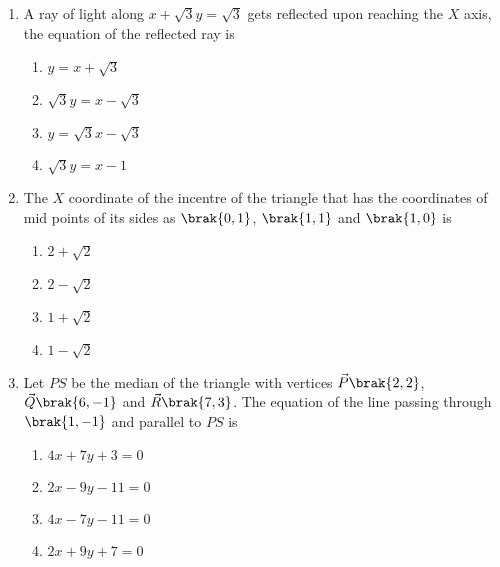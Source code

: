 \begin{enumerate}[label=\thesubsection.\arabic*.,ref=\thesubsection.\theenumi]
\item A ray of light along $x+\sqrt{3}y=\sqrt{3}$ gets reflected upon reaching the $X$ axis, the equation of the reflected ray is \hfill {}
\begin{multicols}{2}
\begin{enumerate}
\item $y=x+\sqrt{3}$
\item $\sqrt{3}y=x-\sqrt{3}$
\item $y=\sqrt{3}x-\sqrt{3}$
\item $\sqrt{3}y=x-1$
\end{enumerate}
\end{multicols}
%
\item The $X$ coordinate of the incentre of the triangle that has the coordinates of mid points of its sides as $\brak{0, 1}$, $\brak{1, 1}$ and $\brak{1, 0}$ is
\hfill {}
\begin{multicols}{4}
\begin{enumerate}
\item $2+\sqrt{2}$
\item $2-\sqrt{2}$
\item $1+\sqrt{2}$
\item $1-\sqrt{2}$
\end{enumerate}
\end{multicols}
%
\item Let $PS$ be the median of the triangle with vertices $\vec{P}\brak{2, 2}$, $\vec{Q}\brak{6, -1}$ and $\vec{R}\brak{7,3}$. The equation of the line passing through $\brak{1, -1}$ and parallel to $PS$ is \hfill {}
\begin{multicols}{2}
\begin{enumerate}
\item $4x+7y+3=0$
\item $2x-9y-11=0$
\item $4x-7y-11=0$
\item $2x+9y+7=0$
\end{enumerate}
\end{multicols}


\end{enumerate}
